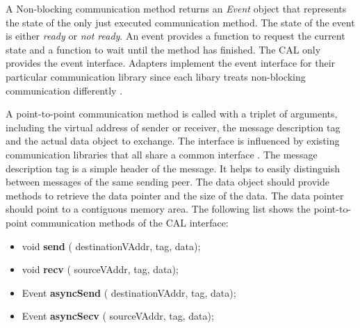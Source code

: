 A Non-blocking communication method returns an \emph{Event} object that represents
the state of the only just executed communication method. The state
of the event is either \emph{ready} or \emph{not ready}. An
event provides a function to request the current state and a function
to  wait until the method has finished. The CAL only provides the
event interface. Adapters implement the  event interface for their
particular communication library since each libary treats non-blocking
communication differently \cite{ref:mpi_specification,ref:boost_asio}.

A point-to-point communication method is called with a triplet of
arguments, including the virtual address of sender or receiver, the
message description tag and the actual data object to exchange.  The
interface is influenced by existing communication libraries that all
share a common interface \cite{ref:boost_mpi, ref:boost_asio,
  ref:zmq}. The message description tag is a simple header of the
message. It helps to easily distinguish between messages of the same
sending peer.  The data object should provide methods to retrieve the
data pointer and the size of the data. The data pointer should point
to a contiguous memory area. The following list shows the
point-to-point communication methods of the CAL interface:

\begin{itemize}

  \item  void \textbf{send }( destinationVAddr, tag, data);
  \item  void \textbf{recv }( sourceVAddr, tag, data);
  \item  Event \textbf{asyncSend }( destinationVAddr, tag, data);
  \item  Event \textbf{asyncSecv }( sourceVAddr, tag, data);

\end{itemize}

